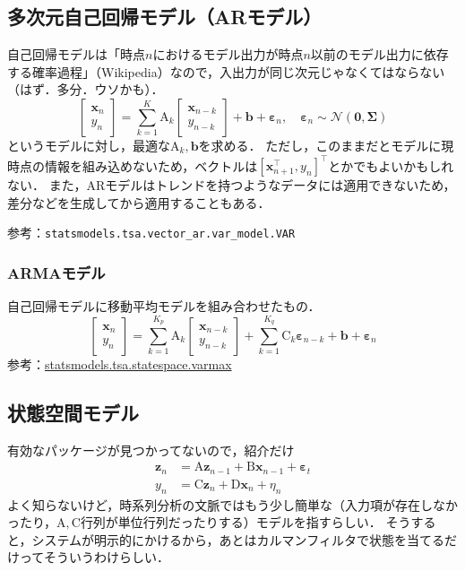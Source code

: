 \documentclass[a4paper,lualatex,ja=standard,oneside,fleqn]{bxjsarticle}
\begin{document}
\subsection{多次元自己回帰モデル（ARモデル）}
自己回帰モデルは「時点$n$におけるモデル出力が時点$n$以前のモデル出力に依存する確率過程」（Wikipedia）なので，入出力が同じ次元じゃなくてはならない（はず．多分．ウソかも）．
\begin{equation*}
  \begin{bmatrix}
    \bm{x}_n\\
    y_n
  \end{bmatrix} = \sum_{k=1}^K\mathrm{A}_k\begin{bmatrix}
    \bm{x}_{n-k}\\
    y_{n-k}
  \end{bmatrix} + \bm{b} + \bm{\varepsilon}_n,\quad \bm{\varepsilon}_n\sim\mathcal{N}(\bm{0},\bm{\Sigma})
\end{equation*}
というモデルに対し，最適な$\mathrm{A}_k,\bm{b}$を求める．
ただし，このままだとモデルに現時点の情報を組み込めないため，ベクトルは$[\bm{x}_{n+1}^\top,y_n]^\top$とかでもよいかもしれない．
また，ARモデルはトレンドを持つようなデータには適用できないため，差分などを生成してから適用することもある．

参考：\verb|statsmodels.tsa.vector_ar.var_model.VAR|

\subsubsection{ARMAモデル}
自己回帰モデルに移動平均モデルを組み合わせたもの．
\begin{equation*}
  \begin{bmatrix}
    \bm{x}_n\\
    y_n
  \end{bmatrix} = \sum_{k=1}^{K_p}\mathrm{A}_k\begin{bmatrix}
    \bm{x}_{n-k}\\
    y_{n-k}
\end{bmatrix} + \sum_{k=1}^{K_q}\mathrm{C}_k\bm{\varepsilon}_{n-k} + \bm{b} + \bm{\varepsilon}_n
\end{equation*}
参考：\href{https://www.statsmodels.org/stable/examples/notebooks/generated/statespace_varmax.html}{statsmodels.tsa.statespace.varmax}

\subsection{状態空間モデル}
有効なパッケージが見つかってないので，紹介だけ
\begin{align*}
  \bm{z}_n &= \mathrm{A}\bm{z}_{n-1} + \mathrm{B}\bm{x}_{n-1} + \bm{\varepsilon}_t\\
  y_n &= \mathrm{C}\bm{z}_n + \mathrm{D}\bm{x}_n + \eta_n
\end{align*}
よく知らないけど，時系列分析の文脈ではもう少し簡単な（入力項が存在しなかったり，$\mathrm{A},\mathrm{C}$行列が単位行列だったりする）モデルを指すらしい．
そうすると，システムが明示的にかけるから，あとはカルマンフィルタで状態を当てるだけってそういうわけらしい．
\end{document}
